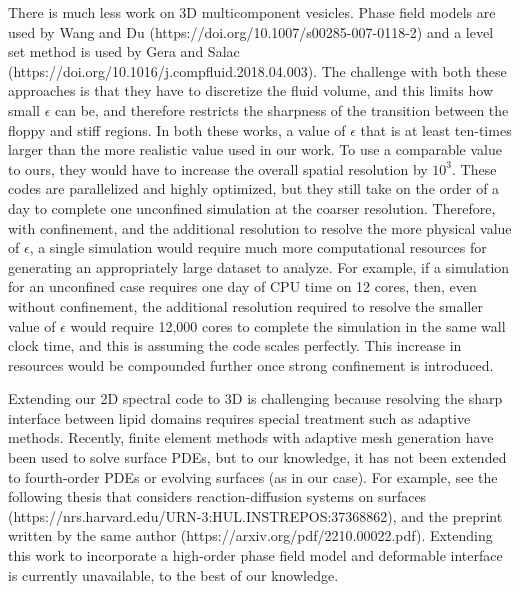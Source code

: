 \documentclass[11pt]{article}
\begin{document}
\begin{enumerate}
There is much less work on 3D multicomponent vesicles. Phase field
models are used by Wang and Du
(https://doi.org/10.1007/s00285-007-0118-2) and a level set method is
used by Gera and Salac
(https://doi.org/10.1016/j.compfluid.2018.04.003). The challenge with
both these approaches is that they have to discretize the fluid volume,
and this limits how small $\epsilon$ can be, and therefore restricts
the sharpness of the transition between the floppy and stiff
regions. In both these works, a value of $\epsilon$ that is at least
ten-times larger than the more realistic value used in our work. To use
a comparable value to ours, they would have to increase the overall
spatial resolution by $10^3$. These codes are parallelized and highly
optimized, but they still take on the order of a day to complete one
unconfined simulation at the coarser resolution. Therefore, with
confinement, and the additional resolution to resolve the more physical
value of $\epsilon$, a single simulation would require much more
computational resources for generating an appropriately large dataset to
analyze. For example, if a simulation for an unconfined case requires
one day of CPU time on 12 cores, then, even without confinement, the
additional resolution required to resolve the smaller value of
$\epsilon$ would require 12,000 cores to complete the simulation in the
same wall clock time, and this is assuming the code scales perfectly.
This increase in resources would be compounded further once strong
confinement is introduced.

Extending our 2D spectral code to 3D is challenging because resolving
the sharp interface between lipid domains requires special treatment
such as adaptive methods. Recently, finite element methods with adaptive
mesh generation have been used to solve surface PDEs, but to our
knowledge, it has not been extended to fourth-order PDEs or evolving
surfaces (as in our case). For example, see the following thesis that
considers reaction-diffusion systems on surfaces
(https://nrs.harvard.edu/URN-3:HUL.INSTREPOS:37368862), and the preprint
written by the same author (https://arxiv.org/pdf/2210.00022.pdf).
Extending this work to incorporate a high-order phase field model and
deformable interface is currently unavailable, to the best of our
knowledge.



\end{enumerate}
\end{document}
